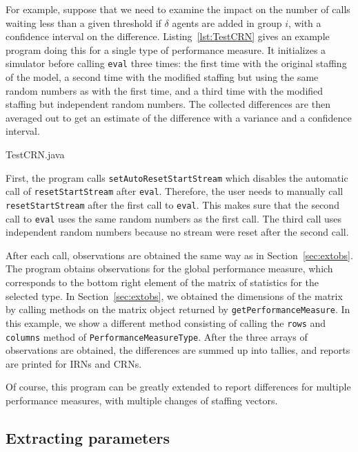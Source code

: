 For example, suppose that we need to examine the impact on the number
of calls waiting less than a given threshold if $\delta$ agents are
added in group $i$, with a confidence interval on the difference.
Listing~\ref{lst:TestCRN} gives an example program doing this for a
single type of performance measure.
It initializes a simulator before calling \texttt{eval} three times:
the first time with the original staffing of the model, a second time
with the modified staffing but using the same random numbers as with
the first time, and a third time with the modified staffing but
independent random numbers.
The collected differences are then averaged out to get an estimate of
the difference with a variance and a confidence interval.


{TestCRN.java}

First, the program calls
\texttt{set\-Auto\-Reset\-Start\-Stream} which disables the automatic
call of \texttt{reset\-Start\-Stream} after \texttt{eval}.
Therefore, the user needs to manually call
\texttt{reset\-Start\-Stream} after the first call to \texttt{eval}.
This makes sure that the second call to \texttt{eval} uses the same
random numbers as the first call.
The third call uses independent random numbers because no stream were
reset after the second call.

After each call, observations are obtained the same way as in
Section~\ref{sec:extobs}.
The program obtains observations for the global performance measure,
which corresponds to the bottom right element of the matrix of
statistics for the selected type.
In Section~\ref{sec:extobs}, we obtained the dimensions of the matrix
by calling methods on the matrix object returned by
\texttt{get\-Performance\-Measure}.
In this example, we show a different method consisting of calling
the \texttt{rows} and \texttt{columns} method of
\texttt{Performance\-Measure\-Type}.
After the three arrays of observations are obtained, the differences
are summed up into tallies, and reports are printed for IRNs and CRNs.

Of course, this program can be greatly extended to report differences
for multiple performance measures, with multiple changes of staffing
vectors.

\subsection{Extracting parameters}
\label{sec:getparams}

